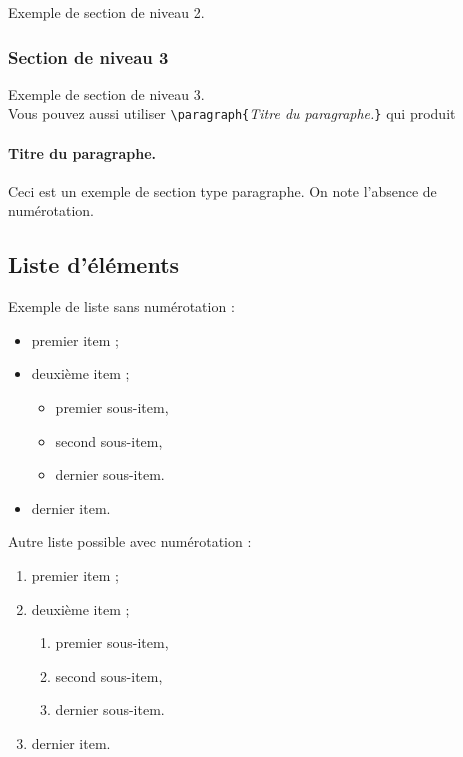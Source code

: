 \documentclass[french]{../cls/llncs}
\begin{document}
           Exemple de section de niveau 2.

      \subsubsection{Section de niveau 3} \label{sect:niveau3}

  Exemple de section de niveau 3.\\
  
 \noindent Vous pouvez aussi utiliser 
\verb+\paragraph{+\textit{Titre du paragraphe.}\verb+}+ qui produit

\paragraph{Titre du paragraphe.} Ceci est un exemple de section type
paragraphe. On note l'absence de numérotation.
  
       \subsection{Liste d'éléments}
         
      Exemple de liste sans numérotation :
\begin{itemize}
    \item premier item ;
    \item deuxième item ;
    \begin{itemize}
      \item premier sous-item,
      \item second sous-item,
      \item dernier sous-item.
  \end{itemize}
  \item dernier item.
\end{itemize}

Autre liste possible avec numérotation :
\begin{enumerate}
    \item premier item ;
    \item deuxième item ;
    \begin{enumerate}
      \item premier sous-item,
      \item second sous-item,
      \item dernier sous-item.
    \end{enumerate}
  \item dernier item.
\end{enumerate}
\end{document}
